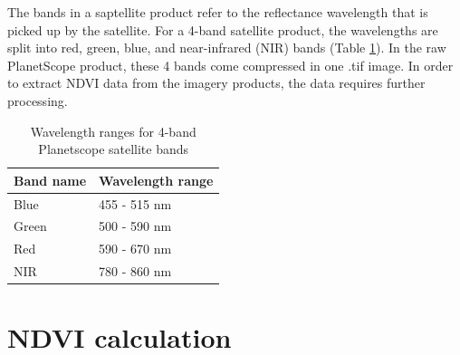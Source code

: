 \documentclass[12pt,twoside]{reedthesis}
\begin{document}
The bands in a saptellite product refer to the reflectance wavelength that is picked up by the satellite. For a 4-band satellite product, the wavelengths are split into red, green, blue, and near-infrared (NIR) bands (Table \ref{tab:wavelength}). In the raw PlanetScope product, these 4 bands come compressed in one .tif image. In order to extract NDVI data from the imagery products, the data requires further processing.
\begin{longtable}[t]{ll}
\caption[4-band satellite wavelength ranges]{\label{tab:wavelength}Wavelength ranges for 4-band Planetscope satellite bands}\\
\toprule
Band name & Wavelength range\\
\midrule
Blue & 455 - 515 nm\\
Green & 500 - 590 nm\\
Red & 590 - 670 nm\\
NIR & 780 - 860 nm\\
\bottomrule
\end{longtable}
\hypertarget{ndvi-calculation}{%
\section{NDVI calculation}\label{ndvi-calculation}}
\end{document}
